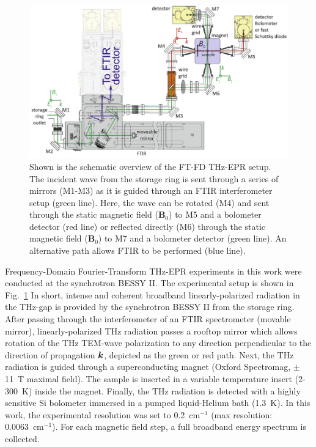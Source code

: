 \begin{figure}[htpb]
\centering
  \includegraphics{Kapitel/Ch4-Images/Ch4-ExperimentSetup.eps}%
  \caption[Schematic Overview of FT-FD THz-EPR setup.]{Shown is the schematic overview of the FT-FD THz-EPR setup. The incident wave from the storage ring is sent through a series of mirrors (M1-M3) as it is guided through an FTIR interferometer setup (green line). Here, the wave can be rotated (M4) and sent through the static magnetic field (\textbf{B}$_0$) to M5 and a bolometer detector (red line) or reflected directly (M6) through the static magnetic field (\textbf{B}$_0$) to M7 and a bolometer detector (green line). An alternative path allows FTIR to be performed (blue line).}
  \label{ch4-fig:ExFDFTSetup}
\end{figure}

Frequency-Domain Fourier-Transform THz-EPR experiments in this work were conducted at the synchrotron BESSY II. The experimental setup is shown in Fig.~\ref{ch4-fig:ExFDFTSetup} \cite{Schnegg09,Nehrkorn13,NEHRKORN201710} In short, intense and coherent broadband linearly-polarized radiation in the THz-gap is provided by the synchrotron BESSY II from the storage ring. \cite{AboBakr02} After passing through the interferometer of an FTIR spectrometer (movable mirror), linearly-polarized THz radiation passes a rooftop mirror which allows rotation of the THz TEM-wave polarization to any direction perpendicular to the direction of propagation $\boldsymbol{k}$, depicted as the green or red path. Next, the THz radiation is guided through a superconducting magnet (Oxford Spectromag, $\pm$11~T maximal field). The sample is inserted in a variable temperature insert (2-300~K) inside the magnet. Finally, the THz radiation is detected with a highly sensitive Si bolometer immersed in a pumped liquid-Helium bath (1.3~K). In this work, the experimental resolution was set to 0.2~cm$^{-1}$ (max resolution: 0.0063~cm$^{-1}$). For each magnetic field step, a full broadband energy spectrum is collected. 

